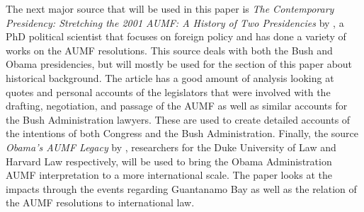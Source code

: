 \documentclass[12pt]{article}
\begin{document}
The next major source that will be used in this paper is \textit{The Contemporary Presidency: Stretching the 2001 AUMF: A History of Two Presidencies} by \autocite{murray2015}, a PhD political scientist that focuses on foreign policy and has done a variety of works on the AUMF resolutions.
This source deals with both the Bush and Obama presidencies, but will mostly be used for the section of this paper about historical background.
The article has a good amount of analysis looking at quotes and personal accounts of the legislators that were involved with the drafting, negotiation, and passage of the AUMF as well as similar accounts for the Bush Administration lawyers.
These are used to create detailed accounts of the intentions of both Congress and the Bush Administration.
Finally, the source \textit{Obama's AUMF Legacy} by \autocite{bradley2016}, researchers for the Duke University of Law and Harvard Law respectively, will be used to bring the Obama Administration AUMF interpretation to a more international scale.
The paper looks at the impacts through the events regarding Guantanamo Bay as well as the relation of the AUMF resolutions to international law.

\newpage
{}
\printbibliography[heading=none]{}
\end{document}
